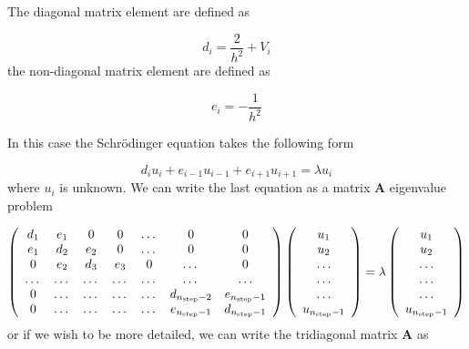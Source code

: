 \documentclass[10pt]{article}
\begin{document}
The diagonal matrix element are defined as

\begin{equation}
d_{i}=\frac{2}{h^{2}}+V_{i}
\end{equation}
the non-diagonal matrix element are
defined as 

\begin{equation}
e_{i}=-\frac{1}{h^{2}}
\end{equation}

In this case the Schr\"{o}dinger equation takes the following form

\begin{equation}
d_{i}u_{i}+e_{i-1}u_{i-1}+e_{i+1}u_{i+1}=\lambda u_{i}
\end{equation}
where $u_{i}$ is unknown. We can write the last equation as a matrix $%
\mathbf{A}$ eigenvalue problem

\[
\left( 
\begin{array}{ccccccc}
d_{1} & e_{1} & 0 & 0 & \dots  & 0 & 0 \\ 
e_{1} & d_{2} & e_{2} & 0 & \dots  & 0 & 0 \\ 
0 & e_{2} & d_{3} & e_{3} & 0 & \dots  & 0 \\ 
\dots  & \dots  & \dots  & \dots  & \dots  & \dots  & \dots  \\ 
0 & \dots  & \dots  & \dots  & \dots  & d_{n_{\mathrm{step}}-2} & e_{n_{%
		\mathrm{step}}-1} \\ 
0 & \dots  & \dots  & \dots  & \dots  & e_{n_{\mathrm{step}}-1} & d_{n_{%
		\mathrm{step}}-1}%
\end{array}%
\right) \left( 
\begin{array}{c}
u_{1} \\ 
u_{2} \\ 
\dots  \\ 
\dots  \\ 
\dots  \\ 
u_{n_{\mathrm{step}}-1}%
\end{array}%
\right) =\lambda \left( 
\begin{array}{c}
u_{1} \\ 
u_{2} \\ 
\dots  \\ 
\dots  \\ 
\dots  \\ 
u_{n_{\mathrm{step}}-1}%
\end{array}%
\right) 
\]%
or if we wish to be more detailed, we can write the tridiagonal matrix $%
\mathbf{A}$ as
\end{document}
